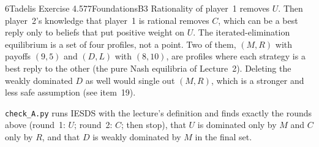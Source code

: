 \begin{exsol}{6}{Tadelis Exercise 4.5}{77}{Foundations}{B3}
\interp Rationality of player~1 removes $U$. Then player~2's knowledge that player~1 is rational
removes $C$, which can be a best reply only to beliefs that put positive weight on $U$. The iterated-elimination
equilibrium is a set of four profiles, not a point. Two of them, $(M,R)$ with payoffs $(9,5)$
and $(D,L)$ with $(8,10)$, are profiles where each strategy is a best reply to the other (the
pure Nash equilibria of Lecture~2). Deleting the weakly dominated $D$ as well would single out
$(M,R)$, which is a stronger and less safe assumption (see item~19).

\verify \texttt{check\_A.py} runs IESDS with the lecture's definition and finds exactly the
rounds above (round~1: $U$; round~2: $C$; then stop), that $U$ is dominated only by $M$ and $C$
only by $R$, and that $D$ is weakly dominated by $M$ in the final set.

\end{exsol}
